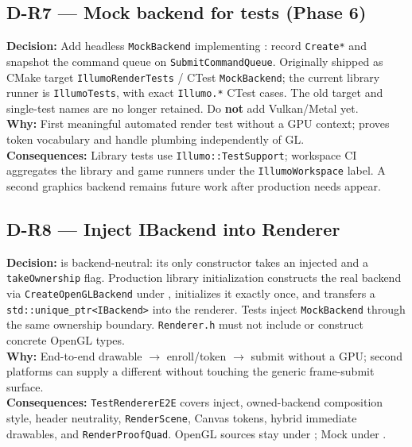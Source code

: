 \subsection*{D-R7 --- Mock backend for tests (Phase 6)}
\begin{decisionbox}[title={D-R7 \quad 2026-07-28}]
\textbf{Decision:} Add headless \texttt{MockBackend} implementing
: record \texttt{Create*} and snapshot the command queue
on \texttt{SubmitCommandQueue}. Originally shipped as CMake target
\texttt{IllumoRenderTests} / CTest \texttt{MockBackend}; the current library
runner is \texttt{IllumoTests}, with exact \texttt{Illumo.*} CTest cases. The
old target and single-test names are no longer retained. Do \textbf{not} add
Vulkan/Metal yet.\\
\textbf{Why:} First meaningful automated render test without a GPU context;
proves token vocabulary and handle plumbing independently of GL.\\
\textbf{Consequences:} Library tests use \texttt{Illumo::TestSupport}; workspace
CI aggregates the library and game runners under the \texttt{IllumoWorkspace}
label. A second graphics backend remains future work after production needs
appear.
\end{decisionbox}

\subsection*{D-R8 --- Inject IBackend into Renderer}
\begin{decisionbox}[title={D-R8 \quad 2026-07-28, refined 2026-08-07}]
\textbf{Decision:}  is backend-neutral: its only constructor
takes an injected  and a \texttt{takeOwnership} flag.
Production library initialization constructs the real backend via
\texttt{CreateOpenGLBackend} under , initializes it
exactly once, and transfers a \texttt{std::unique\_ptr<IBackend>} into the
renderer. Tests inject \texttt{MockBackend} through the same ownership
boundary. \texttt{Renderer.h} must not include or construct concrete OpenGL
types.\\
\textbf{Why:} End-to-end drawable $\rightarrow$ enroll/token $\rightarrow$ submit
without a GPU; second platforms can supply a different 
without touching the generic frame-submit surface.\\
\textbf{Consequences:} \texttt{TestRendererE2E} covers inject, owned-backend
composition style, header neutrality, \texttt{RenderScene}, Canvas tokens,
hybrid immediate drawables, and \texttt{RenderProofQuad}. OpenGL sources stay
under ; Mock under .
\end{decisionbox}

